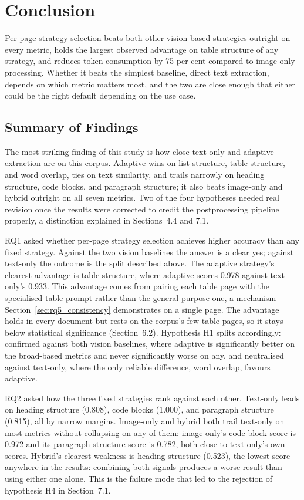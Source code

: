 \chapter{Conclusion}

Per-page strategy selection beats both other vision-based strategies outright
on every metric, holds the largest observed advantage on table structure of
any strategy, and reduces token consumption by 75 per cent compared to
image-only processing. Whether it beats the simplest baseline, direct text
extraction, depends on which metric matters most, and the two are close
enough that either could be the right default depending on the use case.

\section{Summary of Findings}

The most striking finding of this study is how close text-only and adaptive
extraction are on this corpus. Adaptive wins on list structure, table
structure, and word overlap, ties on text similarity, and trails narrowly on
heading structure, code blocks, and paragraph structure; it also beats
image-only and hybrid outright on all seven metrics. Two of the four
hypotheses needed real revision once the results were corrected to credit
the postprocessing pipeline properly, a distinction explained in
Sections~4.4 and 7.1.

RQ1 asked whether per-page strategy selection achieves higher accuracy than
any fixed strategy. Against the two vision baselines the answer is a clear
yes; against text-only the outcome is the split described above.
The adaptive strategy's clearest advantage is table structure, where
adaptive scores 0.978 against text-only's 0.933. This advantage comes from
pairing each table page with the specialised table prompt rather than the
general-purpose one, a mechanism Section~\ref{sec:rq5_consistency}
demonstrates on a single page. The advantage holds in every document
but rests on the corpus's few table pages, so it stays below statistical
significance (Section~6.2). Hypothesis H1 splits accordingly: confirmed
against both vision baselines, where adaptive is significantly better on
the broad-based metrics and never significantly worse on any, and
neutralised against text-only, where the only reliable difference, word
overlap, favours adaptive.

RQ2 asked how the three fixed strategies rank against each other. Text-only
leads on heading structure (0.808), code blocks (1.000), and paragraph
structure (0.815), all by narrow margins. Image-only and hybrid both trail
text-only on most metrics without collapsing on any of them: image-only's
code block score is 0.972 and its paragraph structure score is 0.782, both
close to text-only's own scores. Hybrid's clearest weakness is heading
structure (0.523), the lowest score anywhere in the results: combining both
signals produces a worse result than using either one alone. This is the
failure mode that led to the rejection of hypothesis H4 in Section~7.1.

